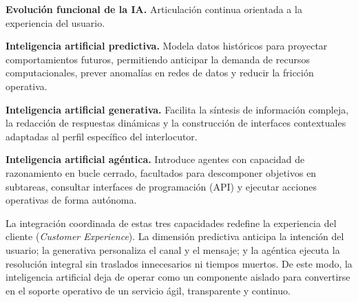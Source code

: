 \begin{center}

{\small\textbf{Evolución funcional de la IA.} Articulación continua orientada a la experiencia del usuario.\par}
\end{center}

\textbf{Inteligencia artificial predictiva.} Modela datos históricos para proyectar comportamientos futuros, permitiendo anticipar la demanda de recursos computacionales, prever anomalías en redes de datos y reducir la fricción operativa.

\textbf{Inteligencia artificial generativa.} Facilita la síntesis de información compleja, la redacción de respuestas dinámicas y la construcción de interfaces contextuales adaptadas al perfil específico del interlocutor.

\textbf{Inteligencia artificial agéntica.} Introduce agentes con capacidad de razonamiento en bucle cerrado, facultados para descomponer objetivos en subtareas, consultar interfaces de programación (API) y ejecutar acciones operativas de forma autónoma.

La integración coordinada de estas tres capacidades redefine la experiencia del cliente (\textit{Customer Experience}). La dimensión predictiva anticipa la intención del usuario; la generativa personaliza el canal y el mensaje; y la agéntica ejecuta la resolución integral sin traslados innecesarios ni tiempos muertos. De este modo, la inteligencia artificial deja de operar como un componente aislado para convertirse en el soporte operativo de un servicio ágil, transparente y continuo.

